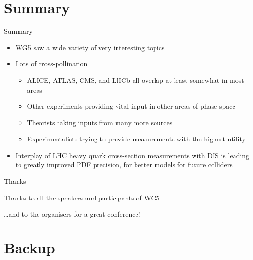 \documentclass[aspectratio=1610]{beamer}
\begin{document}
\section{Summary}
\begin{frame}{Summary}
  \begin{itemize}
    \item WG5 saw a wide variety of very interesting topics
    \item Lots of cross-pollination
      \begin{itemize}
        \item ALICE, ATLAS, CMS, and LHCb all overlap at least somewhat in most areas
        \item Other experiments providing vital input in other areas of phase space
        \item Theorists taking inputs from many more sources
        \item Experimentalists trying to provide measurements with the highest utility
      \end{itemize}
    \item Interplay of LHC heavy quark cross-section measurements with DIS is leading to greatly improved PDF precision, for better models for future colliders
  \end{itemize}
\end{frame}

\begin{frame}{Thanks}
  \begin{center}
    {\Large
    Thanks to all the speakers and participants of WG5\ldots\par
    \bigskip
    \ldots{}and to the organisers for a great conference!
    }
  \end{center}
\end{frame}

\appendix

\section{Backup}
\begin{frame}[c]
  \begin{center}
    \Huge{}
  \end{center}
\end{frame}
\end{document}
